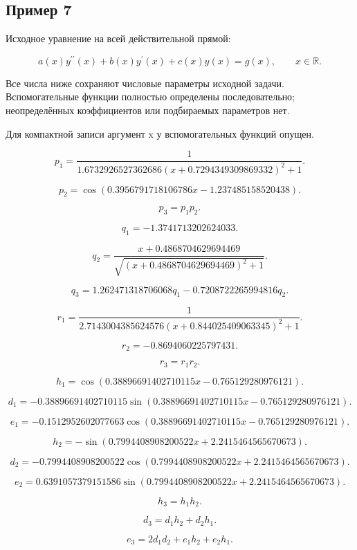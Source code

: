 \subsection*{Пример 7}

Исходное уравнение на всей действительной прямой:

\[a(x)y^{\prime\prime}(x)+b(x)y^\prime(x)+c(x)y(x)=g(x),\qquad x\in\mathbb R.\]

Все числа ниже сохраняют числовые параметры исходной задачи. Вспомогательные функции полностью определены последовательно; неопределённых коэффициентов или подбираемых параметров нет.

Для компактной записи аргумент x у вспомогательных функций опущен.

\[p_{1}=\frac{1}{1.6732926527362686 \left(x + 0.7294349309869332\right)^{2} + 1}.\]

\[p_{2}=\cos{\left(0.3956791718106786 x - 1.237485158520438 \right)}.\]

\[p_{3}=p_{1} p_{2}.\]

\[q_{1}=-1.3741713202624033.\]

\[q_{2}=\frac{x + 0.4868704629694469}{\sqrt{\left(x + 0.4868704629694469\right)^{2} + 1}}.\]

\[q_{3}=1.262471318706068 q_{1} - 0.7208722265994816 q_{2}.\]

\[r_{1}=\frac{1}{2.7143004385624576 \left(x + 0.844025409063345\right)^{2} + 1}.\]

\[r_{2}=-0.8694060225797431.\]

\[r_{3}=r_{1} r_{2}.\]

\[h_{1}=\cos{\left(0.38896691402710115 x - 0.765129280976121 \right)}.\]

\[d_{1}=- 0.38896691402710115 \sin{\left(0.38896691402710115 x - 0.765129280976121 \right)}.\]

\[e_{1}=- 0.1512952602077663 \cos{\left(0.38896691402710115 x - 0.765129280976121 \right)}.\]

\[h_{2}=- \sin{\left(0.7994408908200522 x + 2.2415464565670673 \right)}.\]

\[d_{2}=- 0.7994408908200522 \cos{\left(0.7994408908200522 x + 2.2415464565670673 \right)}.\]

\[e_{2}=0.6391057379151586 \sin{\left(0.7994408908200522 x + 2.2415464565670673 \right)}.\]

\[h_{3}=h_{1} h_{2}.\]

\[d_{3}=d_{1} h_{2} + d_{2} h_{1}.\]

\[e_{3}=2 d_{1} d_{2} + e_{1} h_{2} + e_{2} h_{1}.\]

